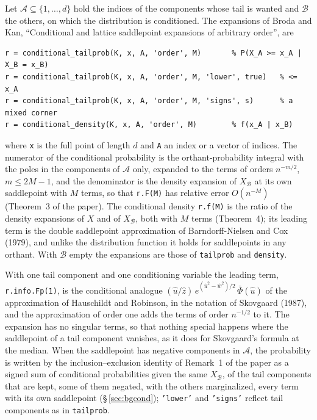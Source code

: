 \documentclass[11pt]{article}
\newcommand{\prog}[1]{\texttt{#1}}
\begin{document}
Let $\mathcal A\subseteq\{1,\ldots,d\}$ hold the indices of the components whose tail is wanted
and $\mathcal B$ the others, on which the distribution is conditioned. The expansions of Broda and
Kan, ``Conditional and lattice saddlepoint expansions of arbitrary order'', are
\begin{lstlisting}
r = conditional_tailprob(K, x, A, 'order', M)       % P(X_A >= x_A | X_B = x_B)
r = conditional_tailprob(K, x, A, 'order', M, 'lower', true)   % <= x_A
r = conditional_tailprob(K, x, A, 'order', M, 'signs', s)      % a mixed corner
r = conditional_density(K, x, A, 'order', M)        % f(x_A | x_B)
\end{lstlisting}
where \prog{x} is the full point of length $d$ and \prog{A} an index or a vector of indices. The
numerator of the conditional probability is the orthant-probability integral with the poles in the
components of $\mathcal A$ only, expanded to the terms of orders $n^{-m/2}$, $m\leq 2M-1$, and the
denominator is the density expansion of $X_{\mathcal B}$ at its own saddlepoint with $M$ terms, so
that \prog{r.F(M)} has relative error $O(n^{-M})$ (Theorem~3 of the paper). The conditional density
\prog{r.f(M)} is the ratio of the density expansions of $X$ and of $X_{\mathcal B}$, both with $M$
terms (Theorem~4); its leading term is the double saddlepoint approximation of Barndorff-Nielsen and
Cox (1979), and unlike the distribution function it holds for saddlepoints in any orthant. With
$\mathcal B$ empty the expansions are those of \prog{tailprob} and \prog{density}.

With one tail component and one conditioning variable the leading term,
\prog{r.info.Fp(1)}, is the conditional analogue $(\hat u/\hat z)\,e^{(\hat u^2-\hat w^2)/2}\,\bar\Phi(\hat u)$
of the approximation of Hauschildt and Robinson, in the notation of Skovgaard (1987), and the
approximation of order one adds the terms of order $n^{-1/2}$ to it. The expansion has no singular
terms, so that nothing special happens where the saddlepoint of a tail component vanishes, as it
does for Skovgaard's formula at the median. When the saddlepoint has negative components in
$\mathcal A$, the probability is written by the inclusion--exclusion identity of Remark~1 of the
paper as a signed sum of conditional probabilities given the same $X_{\mathcal B}$, of the tail
components that are kept, some of them negated, with the others marginalized, every term with its
own saddlepoint (\S\,\ref{sec:bgcond}); \prog{'lower'} and \prog{'signs'} reflect tail components
as in \prog{tailprob}.
\end{document}
